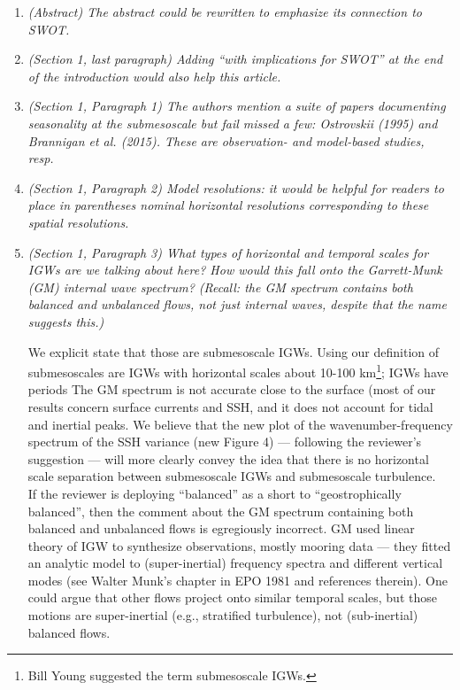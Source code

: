 \documentclass[11pt]{article}
\newcommand{\bdp}{\begin{description}}
\newcommand{\edp}{\end{description}}
\begin{document}
\begin{enumerate}
  \item {\it (Abstract) The abstract could be rewritten to emphasize its connection to SWOT.}

  \item {\it (Section 1, last paragraph) Adding “with implications for SWOT” at the end of the
          introduction would also help this article.}

  \item {\it (Section 1, Paragraph 1) The authors mention a suite of papers documenting
        seasonality at the submesoscale but fail missed a few: Ostrovskii (1995) and
        Brannigan et al. (2015). These are observation- and model-based studies, resp.}

  \item {\it (Section 1, Paragraph 2) Model resolutions: it would be helpful for readers to place in
        parentheses nominal horizontal resolutions corresponding to these spatial resolutions.}

  \item {\it (Section 1, Paragraph 3) What types of horizontal and temporal scales for IGWs are
        we talking about here? How would this fall onto the Garrett-Munk (GM) internal
        wave spectrum? (Recall: the GM spectrum contains both balanced and unbalanced
        flows, not just internal waves, despite that the name suggests this.)}\\

        \bdp
          We explicit state that those are submesoscale IGWs. Using
          our definition of submesoscales are IGWs
          with horizontal scales about 10-100 km\footnote{Bill Young suggested the
          term submesoscale IGWs.}; IGWs have periods  The GM spectrum is not accurate
          close to the surface (most of our results concern surface currents and SSH,
          and it does not account for tidal and inertial peaks. We believe that the
          new plot of the wavenumber-frequency spectrum of the SSH
          variance (new Figure 4) --- following the reviewer's suggestion ---
          will more clearly convey the idea that there is no horizontal scale
          separation between submesoscale IGWs and submesoscale turbulence.\\

          If the reviewer is deploying ``balanced'' as a short to ``geostrophically
          balanced'', then the comment about the GM spectrum containing both balanced
          and unbalanced flows is egregiously incorrect.  GM used linear theory
          of IGW to synthesize observations, mostly mooring data --- they
          fitted an analytic model to (super-inertial) frequency spectra and
          different vertical modes (see Walter Munk's chapter
          in EPO 1981 and references therein).
          One could argue
          that other flows project onto similar temporal scales, but those motions
          are super-inertial (e.g., stratified turbulence), not (sub-inertial)
          balanced flows.
        \edp


\end{enumerate}
\end{document}
